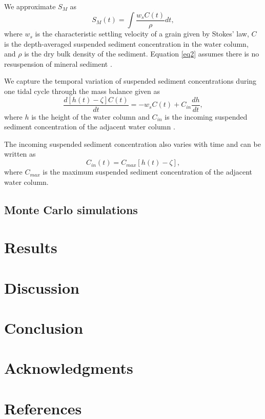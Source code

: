 \documentclass[9pt,twocolumn,twoside,lineno]{pnas-new}
\begin{document}
	We approximate $S_M$ as
	\begin{equation}\label{eq2}
	S_M(t) = \int{\frac{w_{s}C(t)}{\rho}dt},
	\end{equation}
	where $w_s$ is the characteristic settling velocity of a grain given by Stokes' law, $C$ is the depth-averaged suspended sediment concentration in the water column, and $\rho$ is the dry bulk density of the sediment. Equation \ref{eq2} assumes there is no resuspension of mineral sediment \cite{kroneMethodSimulatingMarsh1987}.
	
	We capture the temporal variation of suspended sediment concentrations during one tidal cycle through the mass balance given as
	\begin{equation}\label{eq3}
	\frac{d[h(t)-\zeta]C(t)}{dt} = -w_sC(t)+C_{in}\frac{dh}{dt},
	\end{equation}
	where $h$ is the height of the water column and $C_{in}$ is the incoming suspended sediment concentration of the adjacent water column \cite{kroneMethodSimulatingMarsh1987,frenchNumericalSimulationVertical1993,temmermanModellingLongtermTidal2003,temmermanModellingEstuarineVariations2004}.
	
	The incoming suspended sediment concentration also varies with time and can be written as
	\begin{equation}\label{eq4}
	C_{in}(t) = C_{max}[h(t)-\zeta],
	\end{equation}
	where \(C_{max}\) is the maximum suspended sediment concentration of the adjacent water column. 
	
	\subsection*{Monte Carlo simulations}
	
	
	
	\section*{Results}
	
	\section*{Discussion}
	
	\section*{Conclusion}
	
	\section*{Acknowledgments}
	
	\section*{References}
	
	
	
\end{document}

